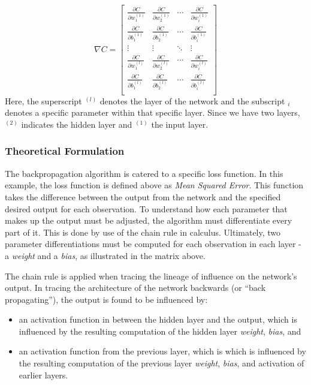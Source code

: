 \[
\nabla{C} =
\begin{bmatrix}
\frac{\partial{C}}{\partial{w_1^{(1)}}} & \frac{\partial{C}}{\partial{w_2^{(1)}}} & \cdots & 
\frac{\partial{C}}{\partial{w_i^{(1)}}} \\
\frac{\partial{C}}{\partial{b_1^{(1)}}} & \frac{\partial{C}}{\partial{b_2^{(1)}}} & \cdots & 
\frac{\partial{C}}{\partial{b_i^{(1)}}} \\
\vdots & \vdots & \ddots & \vdots \\
\frac{\partial{C}}{\partial{w_1^{(l)}}} & \frac{\partial{C}}{\partial{w_2^{(l)}}} & \cdots & 
\frac{\partial{C}}{\partial{w_i^{(l)}}} \\
\frac{\partial{C}}{\partial{b_1^{(l)}}} & \frac{\partial{C}}{\partial{b_2^{(l)}}} & \cdots & 
\frac{\partial{C}}{\partial{b_i^{(l)}}} \\
\end{bmatrix}
\] Here, the superscript \(^{(l)}\) denotes the layer of the network and
the subscript \(_i\) denotes a specific parameter within that specific
layer. Since we have two layers, \(^{(2)}\) indicates the hidden layer
and \(^{(1)}\) the input layer.

\hypertarget{theoretical-formulation}{%
\subsubsection{Theoretical Formulation}\label{theoretical-formulation}}

The backpropagation algorithm is catered to a specific loss function. In
this example, the loss function is defined above as \emph{Mean Squared
Error}. This function takes the difference between the output from the
network and the specified desired output for each observation. To
understand how each parameter that makes up the output must be adjusted,
the algorithm must differentiate every part of it. This is done by use
of the chain rule in calculus. Ultimately, two parameter
differentiations must be computed for each observation in each layer - a
\emph{weight} and a \emph{bias}, as illustrated in the matrix above.

The chain rule is applied when tracing the lineage of influence on the
network's output. In tracing the architecture of the network backwards
(or ``back propagating''), the output is found to be influenced by:

\begin{itemize}
\tightlist
\item
  an activation function in between the hidden layer and the output,
  which is influenced by the resulting computation of the hidden layer
  \emph{weight}, \emph{bias}, and
\item
  an activation function from the previous layer, which is which is
  influenced by the resulting computation of the previous layer
  \emph{weight}, \emph{bias}, and activation of earlier layers.
\end{itemize}

